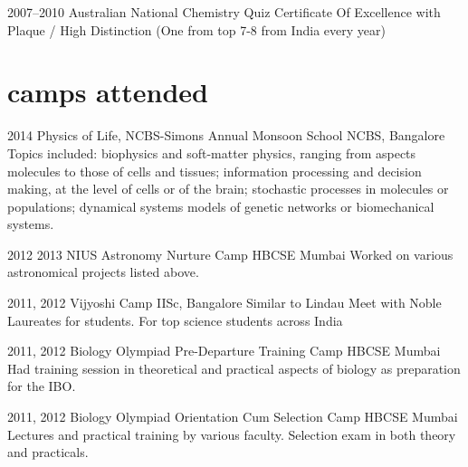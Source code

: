 \documentclass[11pt]{friggeri-cv}%
\begin{document}
\begin{entrylist}
  \entryy
    {2007--2010}
    {Australian National Chemistry Quiz}
    {}
    {Certificate Of Excellence with Plaque / High Distinction (One from top 7-8 from India every year)}
\end{entrylist}




\section{camps attended}

\begin{entrylist}
  \entryy
    {2014}
    {Physics of Life, NCBS-Simons Annual Monsoon School}
    {NCBS, Bangalore}
    {Topics included: biophysics and soft-matter physics, ranging from aspects molecules to those of cells and tissues; information processing and decision making, at the level of cells or of the brain; stochastic processes in molecules or populations; dynamical systems models of genetic networks or biomechanical systems.}
    
\end{entrylist}


\begin{entrylist}
  \entryy
    {2012 2013}
    {NIUS Astronomy Nurture Camp}
    {HBCSE Mumbai}
    {Worked on various astronomical projects listed above.}
\end{entrylist}


\begin{entrylist}
  \entryy
    {2011, 2012}
    {Vijyoshi Camp}
    {IISc, Bangalore}
    {Similar to Lindau Meet with Noble Laureates for students. For top  science students across India }
    
\end{entrylist}

\begin{entrylist}
  \entryy
    {2011, 2012}
    {Biology Olympiad Pre-Departure Training Camp}
    {HBCSE Mumbai}
    {Had training session in theoretical and practical aspects of biology as preparation for the IBO.}
\end{entrylist}

\begin{entrylist}
  \entryy
    {2011, 2012}
    {Biology Olympiad Orientation Cum Selection Camp}
    {HBCSE Mumbai}
    {Lectures and practical training by various faculty. Selection exam in both theory and practicals.}
\end{entrylist}
\end{document}
